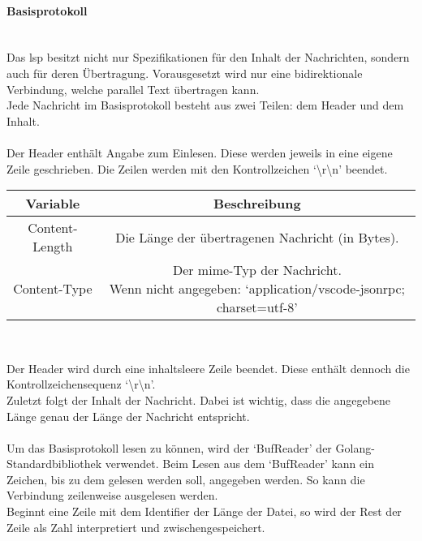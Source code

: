 \documentclass[./einleitung.tex]{subfiles}
\begin{document}
    \paragraph{Basisprotokoll}\mbox{}\\
    Das \acrshort{lsp} besitzt nicht nur Spezifikationen für den Inhalt der Nachrichten, sondern auch für deren Übertragung.
    Vorausgesetzt wird nur eine bidirektionale Verbindung, welche parallel Text übertragen kann.\\
    Jede Nachricht im Basisprotokoll besteht aus zwei Teilen: dem Header und dem Inhalt.
    \\\\
    Der Header enthält Angabe zum Einlesen.
    Diese werden jeweils in eine eigene Zeile geschrieben.
    Die Zeilen werden mit den Kontrollzeichen `{\textbackslash}r{\textbackslash}n' beendet.
    \begin{center}
        \begin{tabular}{|c|c|}
            \hline
            Variable & Beschreibung \\
            \hline
            \hline
            Content-Length & Die Länge der übertragenen Nachricht (in Bytes).\\
            \hline
            Content-Type & \makecell{Der \acrshort{mime}-Typ der Nachricht.\\
            Wenn nicht angegeben: `application/vscode-jsonrpc; charset=utf-8'}\\
            \hline
        \end{tabular}
        \\
        \cite{header}
    \end{center}
    Der Header wird durch eine inhaltsleere Zeile beendet.
    Diese enthält dennoch die Kontrollzeichensequenz `{\textbackslash}r{\textbackslash}n'.\\
    Zuletzt folgt der Inhalt der Nachricht.
    Dabei ist wichtig, dass die angegebene Länge genau der Länge der Nachricht entspricht.
    \\\\
    Um das Basisprotokoll lesen zu können, wird der `BufReader' der Golang-Standardbibliothek verwendet.
    Beim Lesen aus dem `BufReader' kann ein Zeichen, bis zu dem gelesen werden soll, angegeben werden.
    So kann die Verbindung zeilenweise ausgelesen werden.\\
    Beginnt eine Zeile mit dem Identifier der Länge der Datei, so wird der Rest der Zeile als Zahl interpretiert und zwischengespeichert.\\
\end{document}
